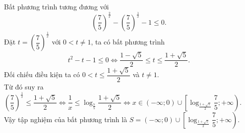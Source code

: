\begin{bt}[1K6BK-A]
{\begin{listEX}
			Bất phương trình tương đương với
			$$\left(\dfrac{7}{5}\right)^{\frac{2}{x}}-\left(\dfrac{7}{5}\right)^{\frac{1}{x}}-1\le 0.$$
			Đặt $t=\left(\dfrac{7}{5}\right)^{\frac{1}{x}}$ với $0<t\not=1$, ta có bất phương trình
			$$t^2-t-1\le 0\Leftrightarrow \dfrac{1-\sqrt{5}}{2}\le t\le \dfrac{1+\sqrt{5}}{2}.$$
			Đối chiếu điều kiện ta có $0<t\le \dfrac{1+\sqrt{5}}{2}$ và $t\not=1$.\\
			Từ đó suy ra $\left(\dfrac{7}{5}\right)^{\frac{1}{x}}\le \dfrac{1+\sqrt{5}}{2}\Leftrightarrow \dfrac{1}{x}\le \log_{\frac{7}{5}}\dfrac{1+\sqrt{5}}{2}\Leftrightarrow x\in (-\infty;0)\cup \left[\log_{\frac{1+\sqrt{5}}{2}}\dfrac{7}{5};+\infty\right)$.\\
			Vậy tập nghiệm của bất phương trình là $S=(-\infty;0)\cup \left[\log_{\frac{1+\sqrt{5}}{2}}\dfrac{7}{5};+\infty\right)$.
		\end{listEX}
	}
\end{bt}



